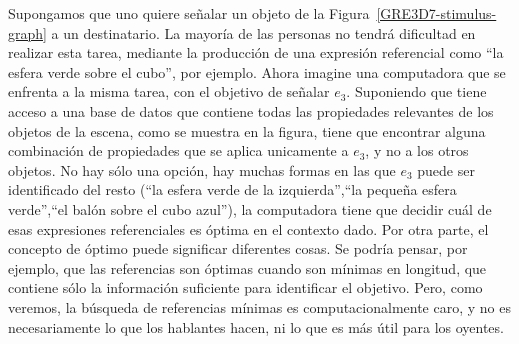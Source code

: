 Supongamos que uno quiere se\~nalar un objeto de la Figura~\ref{GRE3D7-stimulus-graph} a un destinatario. La mayor\'{i}a de las personas
no tendr\'a dificultad en realizar esta tarea, mediante la producci\'on de una expresi\'on referencial como ``la
esfera verde sobre el cubo'', por ejemplo. Ahora imagine una computadora que se enfrenta a la misma
tarea, con el objetivo de se\~nalar $e_3$. Suponiendo que tiene acceso a una base de datos que contiene todas
las propiedades relevantes de los objetos de la escena, como se muestra en la figura, tiene que encontrar alguna
combinaci\'on de propiedades que se aplica unicamente a $e_3$, y no a los otros objetos. No hay s\'olo una opci\'on,
hay muchas formas en las que $e_3$ puede ser identificado del resto (``la esfera verde de la izquierda'',``la peque\~na esfera verde'',``el bal\'on sobre el cubo azul''), la computadora tiene que decidir cu\'al de esas expresiones referenciales es \'optima en el contexto dado. Por otra parte, el concepto de \'optimo puede significar diferentes cosas.
Se podr\'{i}a pensar, por ejemplo, que las referencias son \'optimas cuando son m\'{i}nimas en longitud,
que contiene s\'olo la informaci\'on suficiente para identificar el objetivo. Pero, como veremos, la b\'usqueda de referencias m\'{i}nimas
es computacionalmente caro, y no es necesariamente lo que los hablantes hacen, ni lo que es m\'as \'util para los oyentes.



